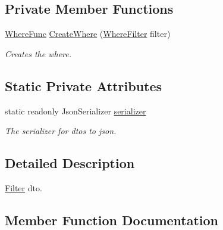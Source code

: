 \subsection*{Private Member Functions}
\begin{DoxyCompactItemize}
\item 
\mbox{\hyperlink{class_bar_none_1_1_shared_1_1_data_transfer_1_1_core_1_1_filter_d_t_o_abde020b2934ca1c07441a24e135c81e2}{Where\+Func}} \mbox{\hyperlink{class_bar_none_1_1_shared_1_1_data_transfer_1_1_core_1_1_filter_d_t_o_a941555ef36d932e46d00f180843cc704}{Create\+Where}} (\mbox{\hyperlink{class_bar_none_1_1_shared_1_1_data_transfer_1_1_core_1_1_filter_1_1_where_filter}{Where\+Filter}} filter)
\begin{DoxyCompactList}\small\item\em Creates the where. \end{DoxyCompactList}\end{DoxyCompactItemize}
\subsection*{Static Private Attributes}
\begin{DoxyCompactItemize}
\item 
static readonly Json\+Serializer \mbox{\hyperlink{class_bar_none_1_1_shared_1_1_data_transfer_1_1_core_1_1_filter_d_t_o_a2b7b0905f7e093f9563fc824023e5a4f}{serializer}}
\begin{DoxyCompactList}\small\item\em The serializer for dtos to json. \end{DoxyCompactList}\end{DoxyCompactItemize}


\subsection{Detailed Description}
\mbox{\hyperlink{namespace_bar_none_1_1_shared_1_1_data_transfer_1_1_core_1_1_filter}{Filter}} dto. 



\subsection{Member Function Documentation}
\mbox{\label{class_bar_none_1_1_shared_1_1_data_transfer_1_1_core_1_1_filter_d_t_o_a941555ef36d932e46d00f180843cc704}} 
